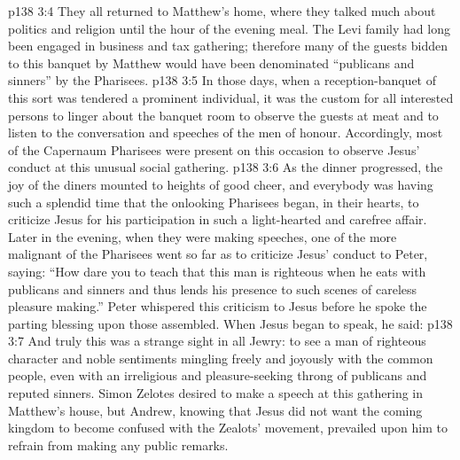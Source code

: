 \vs p138 3:4 \pc They all returned to Matthew’s home, where they talked much about politics and religion until the hour of the evening meal. The Levi family had long been engaged in business and tax gathering; therefore many of the guests bidden to this banquet by Matthew would have been denominated “publicans and sinners” by the Pharisees.
\vs p138 3:5 In those days, when a reception\hyp{}banquet of this sort was tendered a prominent individual, it was the custom for all interested persons to linger about the banquet room to observe the guests at meat and to listen to the conversation and speeches of the men of honour. Accordingly, most of the Capernaum Pharisees were present on this occasion to observe Jesus’ conduct at this unusual social gathering.
\vs p138 3:6 As the dinner progressed, the joy of the diners mounted to heights of good cheer, and everybody was having such a splendid time that the onlooking Pharisees began, in their hearts, to criticize Jesus for his participation in such a light\hyp{}hearted and carefree affair. Later in the evening, when they were making speeches, one of the more malignant of the Pharisees went so far as to criticize Jesus’ conduct to Peter, saying: “How dare you to teach that this man is righteous when he eats with publicans and sinners and thus lends his presence to such scenes of careless pleasure making.” Peter whispered this criticism to Jesus before he spoke the parting blessing upon those assembled. When Jesus began to speak, he said: 
\vs p138 3:7 And truly this was a strange sight in all Jewry: to see a man of righteous character and noble sentiments mingling freely and joyously with the common people, even with an irreligious and pleasure\hyp{}seeking throng of publicans and reputed sinners. Simon Zelotes desired to make a speech at this gathering in Matthew’s house, but Andrew, knowing that Jesus did not want the coming kingdom to become confused with the Zealots’ movement, prevailed upon him to refrain from making any public remarks.
